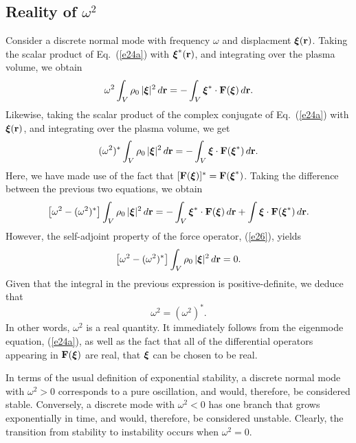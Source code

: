 \documentclass[12pt,prb,aps,notitlepage]{revtex4-1}
\newcommand{\bxi}{\mbox{\boldmath$\xi$}}
\begin{document}
\subsection{Reality of $\omega^2$}
Consider a discrete normal mode with frequency $\omega$ and displacment $\bxi({\bf r})$. 
Taking the scalar product of Eq.~(\ref{e24a}) with $\bxi^\ast({\bf r})$, and integrating over the plasma volume, we obtain
\begin{equation}
\omega^2\int_V\rho_0\,|\bxi|^2\,d{\bf r} = - \int_V\bxi^\ast\cdot {\bf F}(\bxi)\,d{\bf r}.
\end{equation}
Likewise, taking the scalar product of the complex conjugate of Eq.~(\ref{e24a}) with $\bxi({\bf r})$, and integrating over the plasma
volume, we get
\begin{equation}
(\omega^2)^\ast\int_V\rho_0\,|\bxi|^2\,d{\bf r} = - \int_V\bxi\cdot {\bf F}(\bxi^\ast)\,d{\bf r}.
\end{equation}
Here, we have made use of the fact that $[{\bf F}(\bxi)]^\ast={\bf F}(\bxi^\ast)$. 
Taking the difference between the previous two equations, we obtain
\begin{equation}
\left[\omega^2 - (\omega^2)^\ast\right]\int_V\rho_0\,|\bxi|^2\,d{\bf r}=  - \int_V\bxi^\ast\cdot {\bf F}(\bxi)\,d{\bf r}+ \int\bxi\cdot {\bf F}(\bxi^\ast)\,d{\bf r}.
\end{equation}
However, the self-adjoint property of the force operator, (\ref{e26}), 
yields
\begin{equation}
\left[\omega^2 - (\omega^2)^\ast\right]\int_V\rho_0\,|\bxi|^2\,d{\bf r}=0.
\end{equation}
Given that the integral in the previous expression is positive-definite, we deduce that 
\begin{equation}
\omega^2 = (\omega^2)^\ast.
\end{equation}
In other words, $\omega^2$ is a real quantity. It immediately follows  from the eigenmode
equation, (\ref{e24a}), as well as the fact that all of the differential operators appearing in ${\bf F}(\bxi)$ are real,  that
$\bxi$ can be chosen to be real. 

In terms of the usual definition of exponential stability, a discrete normal mode with $\omega^2>0$ corresponds to a pure oscillation, and would, therefore,
be considered stable. Conversely, a discrete mode with $\omega^2<0$ has one branch that grows exponentially in time, and
would, therefore, be considered unstable. Clearly, the transition from stability to instability occurs when $\omega^2=0$. 
\end{document}
